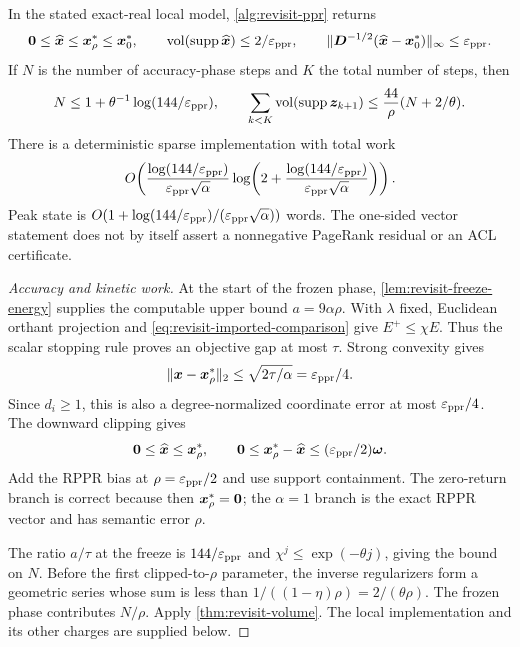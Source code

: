 \begin{theorem}
\label{thm:revisit-semantic}
In the stated exact-real local model, \cref{alg:revisit-ppr} returns
\begin{equation}
 \bm{0}\leq\widehat{\bm{x}}\leq\bm{x}_\rho^*\leq\bm{x}_0^*,\qquad
 \operatorname{vol}(\operatorname{supp}\widehat{\bm{x}})\leq2/\varepsilon_{\mathrm{ppr}},
 \qquad
 \|\bm{D}^{-1/2}(\widehat{\bm{x}}-\bm{x}_0^*)\|_\infty\leq\varepsilon_{\mathrm{ppr}}.
 \label{eq:revisit-semantic}
\end{equation}
If $N$ is the number of accuracy-phase steps and $K$ the total number of
steps, then
\begin{equation}
 N\leq1+\theta^{-1}\log(144/\varepsilon_{\mathrm{ppr}}),\qquad
 \sum_{k<K}\operatorname{vol}(\operatorname{supp}\bm{z}_{k+1})
       \leq\frac{44}{\rho}(N+2/\theta).
 \label{eq:revisit-explicit-work}
\end{equation}
There is a deterministic sparse implementation with total work
\begin{equation}
 O\!\left(
 \frac{\log(144/\varepsilon_{\mathrm{ppr}})}{\varepsilon_{\mathrm{ppr}}\sqrt\alpha}
 \log\!\left(2+
       \frac{\log(144/\varepsilon_{\mathrm{ppr}})}{\varepsilon_{\mathrm{ppr}}\sqrt\alpha}\right)\right).
 \label{eq:revisit-total-work}
\end{equation}
Peak state is
$O(1+\log(144/\varepsilon_{\mathrm{ppr}})/(\varepsilon_{\mathrm{ppr}}\sqrt\alpha))$ words.
The one-sided vector statement does not by itself assert a nonnegative
PageRank residual or an ACL certificate.
\end{theorem}
\begin{proof}[Accuracy and kinetic work]
At the start of the frozen phase, \cref{lem:revisit-freeze-energy} supplies
the computable upper bound $a=9\alpha\rho$. With $\lambda$ fixed,
Euclidean orthant projection and
\cref{eq:revisit-imported-comparison} give $E^+\leq\chi E$.
Thus the scalar stopping rule proves an objective gap at most $\tau$.
Strong convexity gives
\[
 \|\bm{x}-\bm{x}_\rho^*\|_2\leq\sqrt{2\tau/\alpha}=\varepsilon_{\mathrm{ppr}}/4.
\]
Since $d_i\geq1$, this is also a degree-normalized coordinate error at
most $\varepsilon_{\mathrm{ppr}}/4$. The downward clipping gives
\[
 \bm{0}\leq\widehat{\bm{x}}\leq\bm{x}_\rho^*,\qquad
 \bm{0}\leq\bm{x}_\rho^*-\widehat{\bm{x}}\leq(\varepsilon_{\mathrm{ppr}}/2)\bm{\omega}.
\]
Add the RPPR bias at $\rho=\varepsilon_{\mathrm{ppr}}/2$ and use support containment.
The zero-return branch is correct because then $\bm{x}_\rho^*=\bm{0}$;
the $\alpha=1$ branch is the exact RPPR vector and has semantic error $\rho$.

The ratio $a/\tau$ at the freeze is $144/\varepsilon_{\mathrm{ppr}}$ and
$\chi^j\leq\exp(-\theta j)$, giving the bound on $N$.
Before the first clipped-to-$\rho$ parameter, the inverse regularizers
form a geometric series whose sum is less than
$1/((1-\eta)\rho)=2/(\theta\rho)$.
The frozen phase contributes $N/\rho$. Apply
\cref{thm:revisit-volume}. The local implementation and its other charges
are supplied below.
\end{proof}

